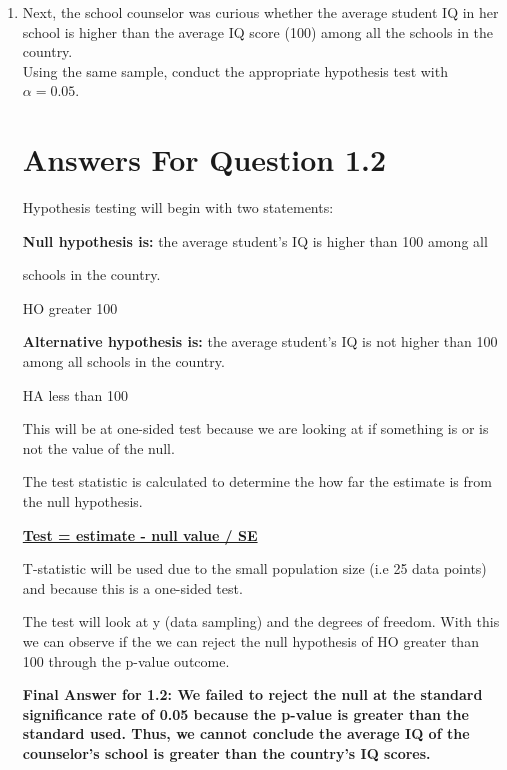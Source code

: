 \documentclass[12pt,letterpaper]{article}
\begin{document}
\begin{enumerate}
\underline{ Calculating the CI}
 
 
 	\textit{ANSWER FOR THE LOWER TAIL: 94.13283}
 
 	\textit{ANSWER FOR THE UPPER TAIL: 102.7472}
 	
 \textbf{	Final Answer for Question 1.1: At the CI level of 90 percent,
 	the upper score average is approximately 103. While the lower average 
 	of the IQ score is 94.}
 
	\item Next, the school counselor was curious  whether  the average student IQ in her school is higher than the average IQ score (100) among all the schools in the country.\\ 
	\noindent Using the same sample, conduct the appropriate hypothesis test with $\alpha=0.05$.
	
	\section*{Answers For Question 1.2}
	
Hypothesis testing will begin with two statements:

\textbf{Null hypothesis is:} the average student's IQ is higher than 100 among all

schools in the country.

 HO greater 100

\textbf{Alternative hypothesis is:} the average student's IQ is not higher than 100 
among all schools in the country.

 HA less than 100

This will be at one-sided test because we are looking at if something is or is not the value of the null. 

The test statistic is calculated to determine the how far the estimate is from the null hypothesis. 

\underline{\textbf{Test = estimate - null value / SE}}

T-statistic will be used due to the small population size (i.e 25 data points) and because this is a one-sided test. 

The test  will look at y (data sampling) and the degrees of freedom. With this we can observe if the we can reject the null hypothesis of HO greater than 100  through the p-value outcome.	



\textbf{Final Answer for 1.2: We failed to reject the null at the standard significance rate of 0.05 because the p-value is greater than the standard used. Thus, we cannot conclude the average IQ of the counselor's school is greater than the country's IQ scores.}

\end{enumerate}
\end{document}
